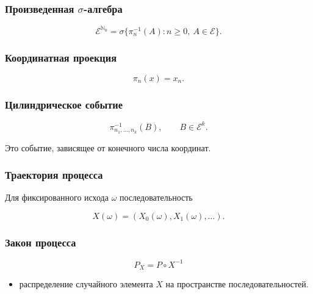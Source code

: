 \documentclass[
  11pt,
  a4paper,
]{article}
\providecommand{\tightlist}{%
  \setlength{\itemsep}{0pt}\setlength{\parskip}{0pt}}
\begin{document}
\subsubsection{\texorpdfstring{Произведенная
\(\sigma\)-алгебра}{Произведенная \textbackslash sigma-алгебра}}\label{ux43fux440ux43eux438ux437ux432ux435ux434ux435ux43dux43dux430ux44f-sigma-ux430ux43bux433ux435ux431ux440ux430}

\[
\mathcal E^{\mathbb N_0}
=
\sigma\{\pi_n^{-1}(A):n\ge0,\ A\in\mathcal E\}.
\]

\subsubsection{Координатная
проекция}\label{ux43aux43eux43eux440ux434ux438ux43dux430ux442ux43dux430ux44f-ux43fux440ux43eux435ux43aux446ux438ux44f}

\[
\pi_n(x)=x_n.
\]

\subsubsection{Цилиндрическое
событие}\label{ux446ux438ux43bux438ux43dux434ux440ux438ux447ux435ux441ux43aux43eux435-ux441ux43eux431ux44bux442ux438ux435}

\[
\pi_{n_1,\ldots,n_k}^{-1}(B),
\qquad
B\in\mathcal E^k.
\]

Это событие, зависящее от конечного числа координат.

\subsubsection{Траектория
процесса}\label{ux442ux440ux430ux435ux43aux442ux43eux440ux438ux44f-ux43fux440ux43eux446ux435ux441ux441ux430}

Для фиксированного исхода \(\omega\) последовательность

\[
X(\omega)=(X_0(\omega),X_1(\omega),\ldots).
\]

\subsubsection{Закон
процесса}\label{ux437ux430ux43aux43eux43d-ux43fux440ux43eux446ux435ux441ux441ux430}

\[
P_X=P\circ X^{-1}
\]

\begin{itemize}
\tightlist
\item
  распределение случайного элемента \(X\) на пространстве
  последовательностей.
\end{itemize}
\end{document}
